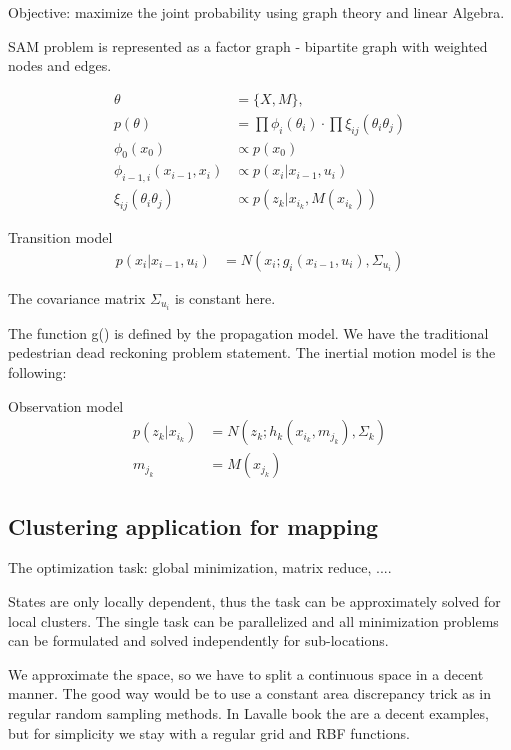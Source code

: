 \documentclass[a4paper, 12pt]{article}
\begin{document}
Objective: maximize the joint probability using graph theory and linear Algebra.

SAM problem is represented as a factor graph - bipartite graph with weighted nodes and edges.

\begin{align}
\theta &= \{X, M\}, \\
p(\theta) &= \prod \phi_i(\theta_i) \cdot \prod \xi_{ij}(\theta_i \theta_j) \\
\phi_0(x_0) &\propto p(x_0) \\
\phi_{i-1, i}(x_{i-1}, x_i) &\propto p(x_i|x_{i-1}, u_i) \\
\xi_{ij}(\theta_i \theta_j) &\propto p(z_k|x_{i_k}, M(x_{i_k})) 
\end{align}

Transition model
\begin{align}
p(x_i|x_{i-1}, u_i) &= N(x_i; g_i(x_{i-1}, u_i), \Sigma_{u_i})
\end{align}

The covariance matrix $\Sigma_{u_i}$ is constant here.

The function g() is defined by the propagation model. We have the traditional pedestrian dead reckoning problem statement. 
The inertial motion model is the following:




Observation model
\begin{align}
p(z_k|x_{i_k}) &= N(z_k; h_k(x_{i_k}, m_{j_k}), \Sigma_{k}) \\
m_{j_k} &= M(x_{j_k})
\end{align}

\subsection{Clustering application for mapping}

The optimization task: global minimization, matrix reduce, ....

States are only locally dependent, thus the task can be approximately solved for local clusters. The single task can be parallelized and all minimization problems can be formulated and solved independently for sub-locations. 

We approximate the space, so we have to split a continuous space in a decent manner. The good way would be to use a constant area discrepancy trick as in regular random sampling methods. In Lavalle book the are a decent examples, but for simplicity we stay with a regular grid and RBF functions.
\end{document}
